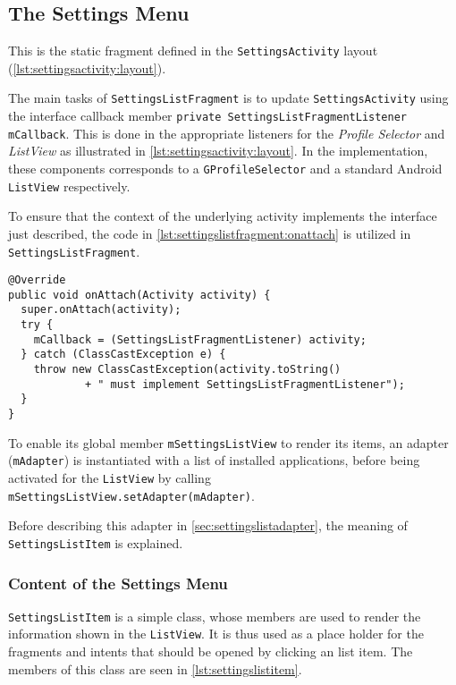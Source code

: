 \subsection{The Settings Menu}\label{sec:settingslistfragment}
This is the static fragment defined in the \lstinline|SettingsActivity| layout (\cref{lst:settingsactivity:layout}).

The main tasks of \lstinline|SettingsListFragment| is to update \lstinline|SettingsActivity| using the interface callback member \lstinline|private SettingsListFragmentListener mCallback|.
This is done in the appropriate listeners for the \textit{Profile Selector} and \textit{ListView} as illustrated in \cref{lst:settingsactivity:layout}.
In the implementation, these components corresponds to a \lstinline|GProfileSelector| and a standard Android \lstinline|ListView| respectively.

To ensure that the context of the underlying activity implements the interface just described, the code in \cref{lst:settingslistfragment:onattach} is utilized in \lstinline|SettingsListFragment|.

\begin{lstlisting}[caption={Implementation to make sure the underlying activity implements the \lstinline|SettingsListFragmentListener| interface.}, label={lst:settingslistfragment:onattach}]
@Override
public void onAttach(Activity activity) {
  super.onAttach(activity);
  try {
    mCallback = (SettingsListFragmentListener) activity;
  } catch (ClassCastException e) {
    throw new ClassCastException(activity.toString()
            + " must implement SettingsListFragmentListener");
  }
}
\end{lstlisting}

To enable its global member \lstinline|mSettingsListView| to render its items, an adapter (\lstinline|mAdapter|) is instantiated with a list of installed applications, before being activated for the \lstinline|ListView| by calling \lstinline|mSettingsListView.setAdapter(mAdapter)|.

Before describing this adapter in \cref{sec:settingslistadapter}, the meaning of \lstinline|SettingsListItem| is explained.

\subsubsection{Content of the Settings Menu}
\lstinline|SettingsListItem| is a simple class, whose members are used to render the information shown in the \lstinline|ListView|.
It is thus used as a place holder for the fragments and intents that should be opened by clicking an list item.
The members of this class are seen in \cref{lst:settingslistitem}.

